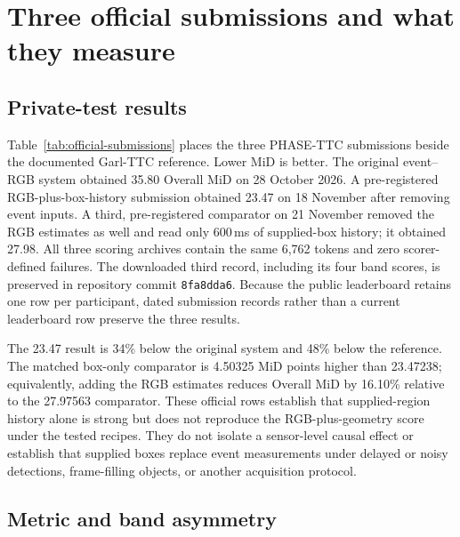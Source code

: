 \FloatBarrier
\section{Three official submissions and what they measure}
\label{sec:official}

\subsection{Private-test results}

Table~\ref{tab:official-submissions} places the three PHASE-TTC submissions beside the documented Garl-TTC reference. Lower MiD is better. The original event--RGB system obtained 35.80 Overall MiD on 28 October 2026. A pre-registered RGB-plus-box-history submission obtained 23.47 on 18 November after removing event inputs. A third, pre-registered comparator on 21 November removed the RGB estimates as well and read only 600\,ms of supplied-box history; it obtained 27.98. All three scoring archives contain the same 6,762 tokens and zero scorer-defined failures. The downloaded third record, including its four band scores, is preserved in repository commit \texttt{8fa8dda6}. Because the public leaderboard retains one row per participant, dated submission records rather than a current leaderboard row preserve the three results.

\begin{table}[htbp]
\centering\footnotesize

\caption{Official GarlTTC Test results over 6,762 tokens. ``Failure'' is the scorer-defined invalid-output rate, not a safety failure rate. The reference and PHASE systems use different models and temporal support.}
\label{tab:official-submissions}
\end{table}

The 23.47 result is 34\% below the original system and 48\% below the reference. The matched box-only comparator is 4.50325 MiD points higher than 23.47238; equivalently, adding the RGB estimates reduces Overall MiD by 16.10\% relative to the 27.97563 comparator. These official rows establish that supplied-region history alone is strong but does not reproduce the RGB-plus-geometry score under the tested recipes. They do not isolate a sensor-level causal effect or establish that supplied boxes replace event measurements under delayed or noisy detections, frame-filling objects, or another acquisition protocol.

\subsection{Metric and band asymmetry}


